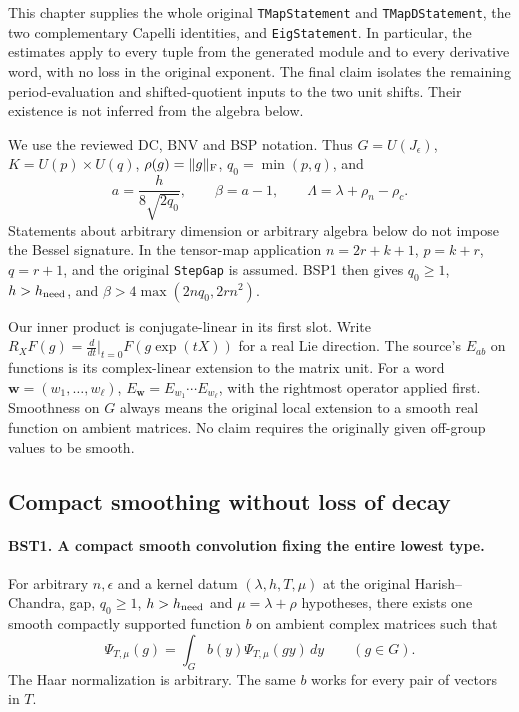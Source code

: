 \documentclass[11pt,a4paper]{article}
\numberwithin{equation}{section}
\theoremstyle{remark}\newtheorem{remark}[theorem]{Remark}
\begin{document}
This chapter supplies the whole original \texttt{TMap\allowbreak Statement} and
\texttt{TMap\allowbreak DStatement}, the two complementary Capelli identities, and
\texttt{Eig\allowbreak Statement}.  In particular, the estimates apply to every
tuple from the generated module and to every derivative word, with no
loss in the original exponent.  The final claim isolates the remaining
period-evaluation and shifted-quotient inputs to the two unit shifts.
Their existence is not inferred from the algebra below.

We use the reviewed DC, BNV and BSP notation.  Thus
$G=U(J_\epsilon)$, $K=U(p)\times U(q)$, $\rho(g)=\|g\|_{\rm F}$,
$q_0=\min(p,q)$, and
\[
 a=\frac{h}{8\sqrt{2q_0}},\qquad \beta=a-1,\qquad
 \Lambda=\lambda+\rho_n-\rho_c.
 \tag{BST.1}
\]
Statements about arbitrary dimension or arbitrary algebra below do not
impose the Bessel signature.  In the tensor-map application
$n=2r+k+1$, $p=k+r$, $q=r+1$, and the original \texttt{Step\allowbreak Gap}
is assumed.  BSP1 then gives $q_0\ge1$, $h>h_{\rm need}$, and
$\beta>4\max(2nq_0,2rn^2)$.

Our inner product is conjugate-linear in its first slot.  Write
$R_XF(g)=\frac{d}{dt}|_{t=0}F(g\exp(tX))$ for a real Lie direction.
The source's $E_{ab}$ on functions is its complex-linear extension to
the matrix unit.  For a word $\mathbf w=(w_1,\ldots,w_\ell)$,
$E_{\mathbf w}=E_{w_1}\cdots E_{w_\ell}$, with the rightmost
operator applied first.  Smoothness on $G$ always means the original
local extension to a smooth real function on ambient matrices.
No claim requires the originally given off-group values to be smooth.

\subsection{Compact smoothing without loss of decay}

\paragraph{BST1. A compact smooth convolution fixing the entire lowest type.}
\label{claim:BST1}
For arbitrary $n,\epsilon$ and a kernel datum
$(\lambda,h,T,\mu)$ at the original
Harish--Chandra, gap, $q_0\ge1$, $h>h_{\rm need}$ and
$\mu=\lambda+\rho$ hypotheses, there exists one smooth compactly
supported function $b$ on ambient complex matrices such that
\[
 \Psi_{T,\mu}(g)
    =\int_G b(y)\Psi_{T,\mu}(gy)\,dy\qquad(g\in G).
 \tag{BST.2}
\]
The Haar normalization is arbitrary.  The same $b$ works for every
pair of vectors in $T$.
\end{document}
